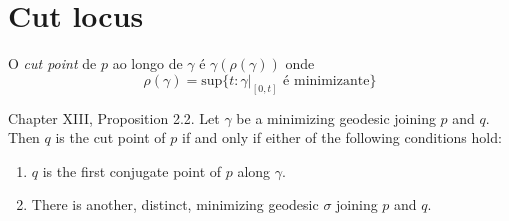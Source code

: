 \section{Cut locus}
\label{section-cut-locus}

\begin{definition}
\label{definition-cut-point}
O {\it cut point} de  $p$ ao longo de $\gamma$ é $\gamma(\rho(\gamma))$ 
onde
$$
\rho(\gamma)=\text{sup}\{t:\gamma|_{[0,t]}\text{ é minimizante}\}
$$

\end{definition}

\begin{proposition}
\label{proposition-cut-point-characterization}
\cite{doc} Chapter XIII, Proposition 2.2. Let $\gamma$ be a minimizing geodesic joining $p$ and $q$. Then $q$ is the cut
point of $p$ if and only if either of the following conditions hold:
\begin{enumerate}
\item $q$ is the first conjugate point of $p$ along $\gamma$.
\item There is another, distinct, minimizing geodesic $\sigma$ joining $p$ and
 $q$.
\end{enumerate}
\end{proposition}

